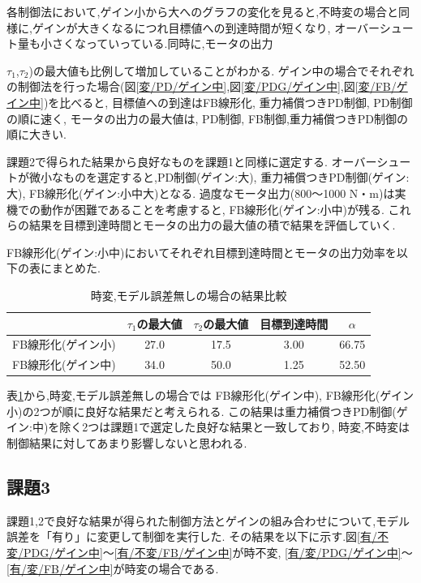 \documentclass[a4paper,11pt,titlepage]{jsarticle}
\begin{document}
各制御法において,ゲイン小から大へのグラフの変化を見ると,不時変の場合と同様に,ゲインが大きくなるにつれ目標値への到達時間が短くなり,
オーバーシュート量も小さくなっていっている.同時に,モータの出力{$\tau_1$,$\tau_2$)の最大値も比例して増加していることがわかる.
ゲイン中の場合でそれぞれの制御法を行った場合(図\ref{変/PD/ゲイン中},図\ref{変/PDG/ゲイン中},図\ref{変/FB/ゲイン中})を比べると,
目標値への到達はFB線形化, 重力補償つきPD制御, PD制御の順に速く, モータの出力の最大値は, PD制御, FB制御,重力補償つきPD制御の順に大きい.
\par
課題2で得られた結果から良好なものを課題1と同様に選定する. オーバーシュートが微小なものを選定すると,PD制御(ゲイン:大), 重力補償つきPD制御(ゲイン:大), FB線形化(ゲイン:小中大)となる.
過度なモータ出力(800〜1000 N・m)は実機での動作が困難であることを考慮すると, FB線形化(ゲイン:小中)が残る.
これらの結果を目標到達時間とモータの出力の最大値の積で結果を評価していく.

FB線形化(ゲイン:小中)においてそれぞれ目標到達時間とモータの出力効率を以下の表にまとめた.
\begin{table}[H]
	\caption{時変,モデル誤差無しの場合の結果比較}
	\label{時変,モデル誤差無しの場合の結果比較}
	\begin{center}
		\begin{tabular}{c|c|c|c|c}\hline
		   & $\tau_1$の最大値 & $\tau_2$の最大値 & 目標到達時間 & $\alpha$ \\ \hline
      FB線形化(ゲイン小) & 27.0 & 17.5 & 3.00 & 66.75 \\ \hline
      FB線形化(ゲイン中) & 34.0 & 50.0 & 1.25 & 52.50 \\ \hline
	   \end{tabular}
\end{center}
\end{table}

表\ref{時変,モデル誤差無しの場合の結果比較}から,時変,モデル誤差無しの場合では
FB線形化(ゲイン中), FB線形化(ゲイン小)の2つが順に良好な結果だと考えられる.
この結果は重力補償つきPD制御(ゲイン:中)を除く2つは課題1で選定した良好な結果と一致しており, 時変,不時変は制御結果に対してあまり影響しないと思われる.

\subsection{課題3}
課題1,2で良好な結果が得られた制御方法とゲインの組み合わせについて,モデル誤差を「有り」に変更して制御を実行した.
その結果を以下に示す.図\ref{有/不変/PDG/ゲイン中}〜\ref{有/不変/FB/ゲイン中}が時不変, \ref{有/変/PDG/ゲイン中}〜\ref{有/変/FB/ゲイン中}が時変の場合である.

}
\end{document}
